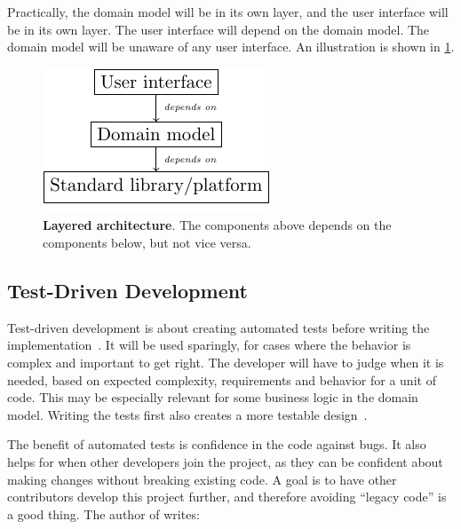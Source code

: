 Practically, the domain model will be in its own layer, and the user interface will be in its own layer.
The user interface will depend on the domain model.
The domain model will be unaware of any user interface.
An illustration is shown in \cref{fig:ddd-layered}.

\begin{figure}[htbp]  %
  \centering
  \includegraphics{figures/layered.pdf}
  \caption[Layered Architecture]{\textbf{Layered architecture}. The components above depends on the components below, but not vice versa.}\label{fig:ddd-layered}
\end{figure}


\subsection{Test-Driven Development}

Test-driven development is about creating automated tests before writing the implementation~\cite[p.~105]{knibergScrumXPTrenches2015}.
It will be used sparingly, for cases where the behavior is complex and important to get right.
The developer will have to judge when it is needed, based on expected complexity, requirements and behavior for a unit of code.
This may be especially relevant for some business logic in the domain model.
Writing the tests first also creates a more testable design~\cite[p.~106]{knibergScrumXPTrenches2015}.


The benefit of automated tests is confidence in the code against bugs.
It also helps for when other developers join the project, as they can be confident about making changes without breaking existing code.
A goal is to have other contributors develop this project further, and therefore avoiding ``legacy code'' is a good thing.
The author of  writes:

